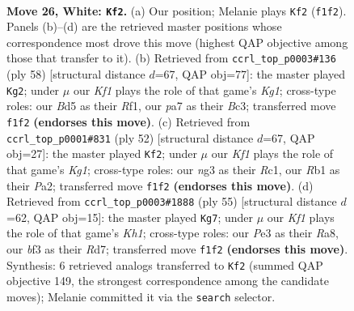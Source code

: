 \documentclass[11pt]{article}
\begin{document}
\clearpage

\begin{figure}[p]\centering
\begin{subfigure}{0.46\textwidth}\centering
\resizebox{\linewidth}{!}{%
\newchessgame
\chessboard[
  setfen={1r3r2/pp4k1/6pp/2pB4/4pP1P/N3Pbn1/PP6/1RB2K2 w - - 0 26},
  showmover=false,
  pgfstyle=straightmove, color=movearrow, markmove={f1-f2}
]}
\caption{}
\end{subfigure}\hfill
\begin{subfigure}{0.46\textwidth}\centering
\resizebox{\linewidth}{!}{%
\newchessgame
\chessboard[
  setfen={4rrk1/p5pp/8/2pRNp2/2P1n3/P1B1b1P1/1P5P/5RK1 w - - 0 30},
  showmover=false,
  pgfstyle=straightmove, color=movearrow, markmove={g1-g2}
]}
\caption{}
\end{subfigure}
\\[4pt]
\begin{subfigure}{0.46\textwidth}\centering
\resizebox{\linewidth}{!}{%
\newchessgame
\chessboard[
  setfen={2r1r3/p2b1pk1/3P2p1/2B4p/p2P1P1P/5B2/P5P1/2R3K1 w - - 2 27},
  showmover=false,
  pgfstyle=straightmove, color=movearrow, markmove={g1-f2}
]}
\caption{}
\end{subfigure}\hfill
\begin{subfigure}{0.46\textwidth}\centering
\resizebox{\linewidth}{!}{%
\newchessgame
\chessboard[
  setfen={r4b1k/1b1r4/p2p2pp/1p1Pp3/4N1PP/1P2B3/1P3PK1/2RR4 b - - 0 28},
  showmover=false,
  pgfstyle=straightmove, color=movearrow, markmove={h8-g7}
]}
\caption{}
\end{subfigure}
\caption{\textbf{Move 26, White: \texttt{Kf2}.} (a) Our position; Melanie plays \texttt{Kf2} (\texttt{f1f2}). Panels (b)--(d) are the retrieved master positions whose correspondence most drove this move (highest QAP objective among those that transfer to it). (b) Retrieved from \texttt{ccrl\_top\_p0003\#136} (ply 58) [structural distance $d$=67, QAP obj=77]: the master played \texttt{Kg2}; under $\mu$ our \emph{Kf1} plays the role of that game's \emph{Kg1}; cross-type roles: our \emph{B}d5 as their \emph{R}f1, our \emph{p}a7 as their \emph{B}c3; transferred move \texttt{f1f2} \textbf{(endorses this move)}. (c) Retrieved from \texttt{ccrl\_top\_p0001\#831} (ply 52) [structural distance $d$=67, QAP obj=27]: the master played \texttt{Kf2}; under $\mu$ our \emph{Kf1} plays the role of that game's \emph{Kg1}; cross-type roles: our \emph{n}g3 as their \emph{R}c1, our \emph{R}b1 as their \emph{P}a2; transferred move \texttt{f1f2} \textbf{(endorses this move)}. (d) Retrieved from \texttt{ccrl\_top\_p0003\#1888} (ply 55) [structural distance $d$=62, QAP obj=15]: the master played \texttt{Kg7}; under $\mu$ our \emph{Kf1} plays the role of that game's \emph{Kh1}; cross-type roles: our \emph{P}e3 as their \emph{R}a8, our \emph{b}f3 as their \emph{R}d7; transferred move \texttt{f1f2} \textbf{(endorses this move)}. Synthesis: 6 retrieved analogs transferred to \texttt{Kf2} (summed QAP objective 149, the strongest correspondence among the candidate moves); Melanie committed it via the \texttt{search} selector.}
\label{fig:thought-m50}
\end{figure}
\end{document}
